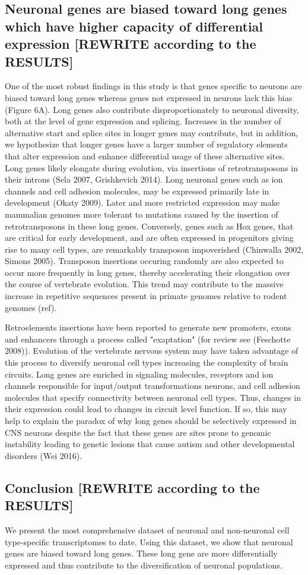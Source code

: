 \subsection{Neuronal genes are biased toward long genes which have higher capacity of differential expression [REWRITE according to the RESULTS]}
One of the most robust findings in this study is that genes specific to neurons are biased toward long genes whereas genes not expressed in neurons lack this bias (Figure 6A). Long genes also contribute disproportionately to neuronal diversity, both at the level of gene expression and splicing. Increases in the number of alternative start and splice sites in longer genes may contribute, but in addition, we hypothesize that longer genes have a larger number of regulatory elements that alter expression and enhance differential usage of these alternative sites. Long genes likely elongate during evolution, via insertions of retrotransposons in their introns (Sela 2007, Grishkevich 2014). Long neuronal genes such as ion channels and cell adhesion molecules, may be expressed primarily late in development (Okaty 2009). Later and more restricted expression may make mammalian genomes more tolerant to mutations caused by the insertion of retrotransposons in these long genes. Conversely, genes such as Hox genes, that are critical for early development, and are often expressed in progenitors giving rise to many cell types, are remarkably transposon impoverished (Chinwalla 2002, Simons 2005). Transposon insertions occuring randomly are also expected to occur more frequently in long genes, thereby accelerating their elongation over the course of vertebrate evolution. This trend may contribute to the massive increase in repetitive sequences present in primate genomes relative to rodent genomes (ref).

Retroelements insertions have been reported to generate new promoters, exons and enhancers through a process called "exaptation" (for review see (Feschotte 2008)). Evolution of the vertebrate nervous system may have taken advantage of this process to diversify neuronal cell types increasing the complexity of brain circuits. Long genes are enriched in signaling molecules, receptors and ion channels responsible for input/output transformations neurons, and cell adhesion molecules that specify connectivity between neuronal cell types. Thus, changes in their expression could lead to changes in circuit level function. If so, this may help to explain the paradox of why long genes should be selectively expressed in CNS neurons despite the fact that these genes are sites prone to genomic instability leading to genetic lesions that cause autism and other developmental disorders (Wei 2016).

\subsection{Conclusion [REWRITE according to the RESULTS]}
We present the most comprehensive dataset of neuronal and non-neuronal cell type-specific transcriptomes to date. Using this dataset, we show that neuronal genes are biased toward long genes. These long gene are more differentially expressed and thus contribute to the diversification of neuronal populations.
